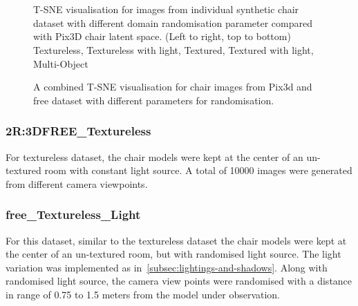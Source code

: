 \begin{figure}[!ht]
    \centering
    \resizebox{0.49\linewidth}{5cm}{}
    \resizebox{0.49\linewidth}{5cm}{}\\
    \resizebox{0.49\linewidth}{5cm}{}
    \resizebox{0.49\linewidth}{5cm}{}\\
    \resizebox{0.49\linewidth}{5cm}{}
    \caption{T-SNE visualisation for images from individual synthetic chair dataset with different domain randomisation parameter compared with Pix3D chair latent space.
        (Left to right, top to bottom) Textureless, Textureless with light, Textured, Textured with light, Multi-Object}
    \label{fig:tsne per chair dataset}
\end{figure}


\begin{figure}
    \centering
    \resizebox{\textwidth}{!}{}
    \caption{A combined T-SNE visualisation for chair images from Pix3d and \gls{free} dataset with different parameters for randomisation.}
    \label{fig:pix3dchair_s2r3dfreechair}
\end{figure}

\subsubsection{2R:3DFREE\_Textureless}

    For textureless dataset, the chair models were kept at the center of an un-textured room with constant light source.
    A total of 10000 images were generated from different camera viewpoints.

\subsubsection{\gls{free}\_Textureless\_Light}

    For this dataset, similar to the textureless dataset the chair models were kept at the center of an un-textured room, but with randomised light source.
    The light variation was implemented as in~\ref{subsec:lightings-and-shadows}.
    Along with randomised light source, the camera view points were randomised with a distance in range of 0.75 to 1.5 meters from the model under observation.

